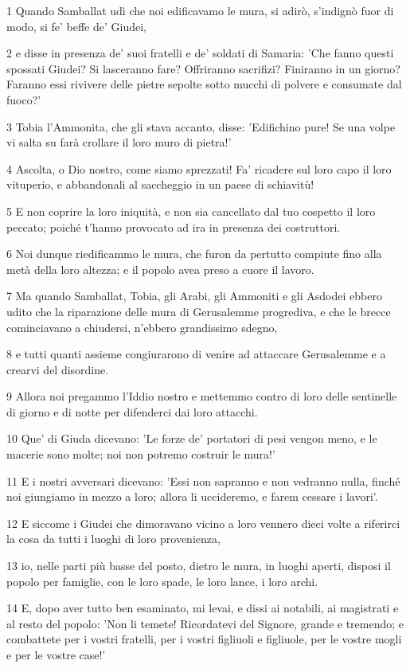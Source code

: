 \par 1 Quando Samballat udì che noi edificavamo le mura, si adirò, s'indignò fuor di modo, si fe' beffe de' Giudei,
\par 2 e disse in presenza de' suoi fratelli e de' soldati di Samaria: 'Che fanno questi spossati Giudei? Si lasceranno fare? Offriranno sacrifizi? Finiranno in un giorno? Faranno essi rivivere delle pietre sepolte sotto mucchi di polvere e consumate dal fuoco?'
\par 3 Tobia l'Ammonita, che gli stava accanto, disse: 'Edifichino pure! Se una volpe vi salta su farà crollare il loro muro di pietra!'
\par 4 Ascolta, o Dio nostro, come siamo sprezzati! Fa' ricadere sul loro capo il loro vituperio, e abbandonali al saccheggio in un paese di schiavitù!
\par 5 E non coprire la loro iniquità, e non sia cancellato dal tuo cospetto il loro peccato; poiché t'hanno provocato ad ira in presenza dei costruttori.
\par 6 Noi dunque riedificammo le mura, che furon da pertutto compiute fino alla metà della loro altezza; e il popolo avea preso a cuore il lavoro.
\par 7 Ma quando Samballat, Tobia, gli Arabi, gli Ammoniti e gli Asdodei ebbero udito che la riparazione delle mura di Gerusalemme progrediva, e che le brecce cominciavano a chiudersi, n'ebbero grandissimo sdegno,
\par 8 e tutti quanti assieme congiurarono di venire ad attaccare Gerusalemme e a crearvi del disordine.
\par 9 Allora noi pregammo l'Iddio nostro e mettemmo contro di loro delle sentinelle di giorno e di notte per difenderci dai loro attacchi.
\par 10 Que' di Giuda dicevano: 'Le forze de' portatori di pesi vengon meno, e le macerie sono molte; noi non potremo costruir le mura!'
\par 11 E i nostri avversari dicevano: 'Essi non sapranno e non vedranno nulla, finché noi giungiamo in mezzo a loro; allora li uccideremo, e farem cessare i lavori'.
\par 12 E siccome i Giudei che dimoravano vicino a loro vennero dieci volte a riferirci la cosa da tutti i luoghi di loro provenienza,
\par 13 io, nelle parti più basse del posto, dietro le mura, in luoghi aperti, disposi il popolo per famiglie, con le loro spade, le loro lance, i loro archi.
\par 14 E, dopo aver tutto ben esaminato, mi levai, e dissi ai notabili, ai magistrati e al resto del popolo: 'Non li temete! Ricordatevi del Signore, grande e tremendo; e combattete per i vostri fratelli, per i vostri figliuoli e figliuole, per le vostre mogli e per le vostre case!'
